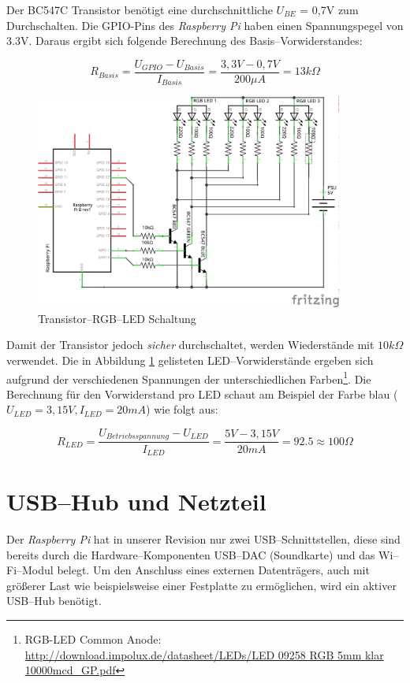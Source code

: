 \documentclass[11pt,ngerman,toc=listof,index=totoc]{scrreprt}
\begin{document}
Der BC547C Transistor benötigt eine durchschnittliche \(U_{BE}\) = 0,7V
zum Durchschalten. Die GPIO-Pins des \emph{Raspberry Pi} haben einen
Spannungspegel von 3.3V. Daraus ergibt sich folgende Berechnung des
Basis--Vorwiderstandes:

\[R_{Basis} = \frac{U_{GPIO} - U_{Basis}}{I_{Basis}} = \frac{3,3V - 0,7V}{200\mu A} = 13k\Omega \]

\begin{figure}[h!]
  \centering
\includegraphics[width=0.9\textwidth]{images/transistorled.png}
  \caption{Transistor--RGB--LED Schaltung}
  \label{transled}
\end{figure}

Damit der Transistor jedoch \emph{sicher} durchschaltet, werden
Wiederstände mit \(10k \Omega\) verwendet. Die in Abbildung
\ref{transled} gelisteten LED--Vorwiderstände ergeben sich aufgrund der
verschiedenen Spannungen der unterschiedlichen Farben\footnote{RGB-LED
  Common Anode:
  \url{http://download.impolux.de/datasheet/LEDs/LED 09258 RGB 5mm klar 10000mcd_GP.pdf}}.
Die Berechnung für den Vorwiderstand pro LED schaut am Beispiel der
Farbe blau (\(U_{LED} = 3,15V, I_{LED} = 20mA\)) wie folgt aus:

\[R_{LED} = \frac{U_{Betriebsspannung} - U_{LED}}{I_{LED}} = \frac{5V - 3,15V}{20mA} =92.5 \approx 100\Omega\]

\section{USB--Hub und Netzteil}\label{usbhub-und-netzteil}

Der \emph{Raspberry Pi} hat in unserer Revision nur zwei
USB--Schnittstellen, diese sind bereits durch die Hardware--Komponenten
USB--DAC (Soundkarte) und das Wi--Fi--Modul belegt. Um den Anschluss
eines externen Datenträgers, auch mit größerer Last wie beispielsweise
einer Festplatte zu ermöglichen, wird ein aktiver USB--Hub benötigt.
\end{document}
